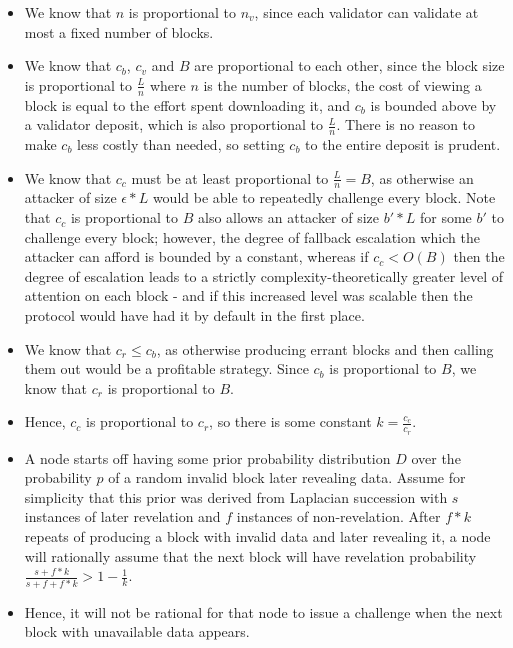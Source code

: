 \documentclass[11pt,a4paper]{report}
\theoremstyle{plain}
\theoremstyle{definition}
\theoremstyle{remark}
\begin{document}
\begin{itemize}
\item
We know that $n$ is proportional to $n_v$, since each validator can validate at most a fixed number of blocks.
\item
We know that $c_b$, $c_v$ and $B$ are proportional to each other, since the block size is proportional to $\frac{L}{n}$ where $n$ is the number of blocks, the cost of viewing a block is equal to the effort spent downloading it, and $c_b$ is bounded above by a validator deposit, which is also proportional to $\frac{L}{n}$. There is no reason to make $c_b$ less costly than needed, so setting $c_b$ to the entire deposit is prudent.
\item
We know that $c_c$ must be at least proportional to $\frac{L}{n} = B$, as otherwise an attacker of size $\epsilon * L$ would be able to repeatedly challenge every block. Note that $c_c$ is proportional to $B$ also allows an attacker of size $b' * L$ for some $b'$ to challenge every block; however, the degree of fallback escalation which the attacker can afford is bounded by a constant, whereas if $c_c < O(B)$ then the degree of escalation leads to a strictly complexity-theoretically greater level of attention on each block - and if this increased level was scalable then the protocol would have had it by default in the first place.
\item
We know that $c_r \le c_b$, as otherwise producing errant blocks and then calling them out would be a profitable strategy. Since $c_b$ is proportional to $B$, we know that $c_r$ is proportional to $B$.
\item
Hence, $c_c$ is proportional to $c_r$, so there is some constant $k = \frac{c_c}{c_r}$.
\item
A node starts off having some prior probability distribution $D$ over the probability $p$ of a random invalid block later revealing data. Assume for simplicity that this prior was derived from Laplacian succession \citep{laplace_essai_1840} with $s$ instances of later revelation and $f$ instances of non-revelation. After $f * k$ repeats of producing a block with invalid data and later revealing it, a node will rationally assume that the next block will have revelation probability $\frac{s + f * k}{s + f + f * k} > 1 - \frac{1}{k}$.


\item
Hence, it will not be rational for that node to issue a challenge when the next block with unavailable data appears.
\end{itemize}
\end{document}
